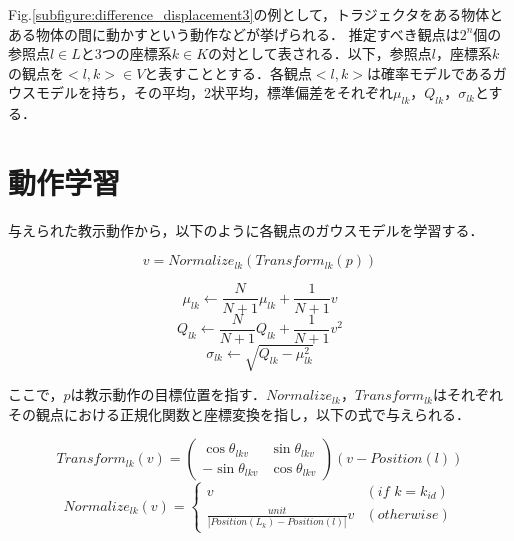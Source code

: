 Fig.\ref{subfigure:difference_displacement3}の例として，トラジェクタをある物体とある物体の間に動かすという動作などが挙げられる．
推定すべき観点は$2^{n}$個の参照点$l∈L$と3つの座標系$k∈K$の対として表される．以下，参照点$l$，座標系$k$の観点を$<l , k> ∈ V$と表すこととする．各観点$<l , k>$は確率モデルであるガウスモデルを持ち，その平均，2状平均，標準偏差をそれぞれ$μ_{lk}$，$Q_{lk}$，$σ_{lk}$とする．

\section{動作学習}

与えられた教示動作から，以下のように各観点のガウスモデルを学習する．

\begin{equation}
	v = Normalize_{lk}(Transform_{lk}(p))
\end{equation}

\begin{equation}
	μ_{lk}  \leftarrow \frac{N}{N+1}μ_{lk}+\frac{1}{N+1}v
\end{equation}
\begin{equation}
	Q_{lk}  \leftarrow \frac{N}{N+1}Q_{lk}+\frac{1}{N+1}v^2	
\end{equation}
\begin{equation}
	σ_{lk}  \leftarrow \sqrt{Q_{lk} - μ_{lk}^2}
\end{equation}

ここで，$p$は教示動作の目標位置を指す．$Normalize_{lk}$，$Transform_{lk}$はそれぞれその観点における正規化関数と座標変換を指し，以下の式で与えられる．

\begin{equation}
	Transform_{lk}(v) = 
	\begin{pmatrix}
        	\cos θ_{lkv} & \sin θ_{lkv} \\
        	-\sin θ_{lkv} & \cos θ_{lkv}
	\end{pmatrix}
	(v-Position(l))
\end{equation}
\begin{equation}
	\label{equation:normalize}
	Normalize_{lk}(v) = 
	\begin{cases}
		v & (if\,\,k=k_{id}) \\
		\frac{unit}{| Position(L_{k})-Position(l) |}v & (otherwise)
	\end{cases}
\end{equation}


